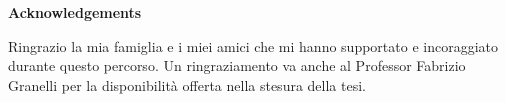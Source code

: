 \thispagestyle{empty}

\begin{center}
  {\bf \Huge Acknowledgements}
\end{center}

\vspace{4cm}
Ringrazio la mia famiglia e i miei amici che mi hanno supportato e incoraggiato durante questo percorso. Un ringraziamento va anche al Professor Fabrizio Granelli per la disponibilità offerta nella stesura della tesi.
